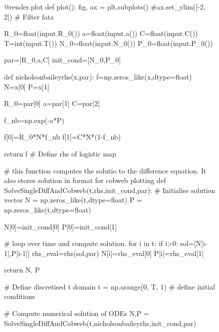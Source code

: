 \documentclass[
  letterpaper,
  DIV=11,
  numbers=noendperiod]{scrreprt}
\newenvironment{Shaded}{\begin{snugshade}}{\end{snugshade}}
\newcommand{\NormalTok}[1]{\textcolor[rgb]{0.00,0.23,0.31}{#1}}
\begin{document}
\begin{figure}
{\begin{Shaded}
\begin{Highlighting}[]
\NormalTok{    @render.plot}
\NormalTok{    def plot():}
\NormalTok{        fig, ax = plt.subplots()}
\NormalTok{        \#ax.set\_ylim([{-}2, 2])}
\NormalTok{        \# Filter fata}
        
        
\NormalTok{        R\_0=float(input.R\_0())}
\NormalTok{        a=float(input.a())}
\NormalTok{        C=float(input.C())}
\NormalTok{        T=int(input.T())}
\NormalTok{        N\_0=float(input.N\_0())}
\NormalTok{        P\_0=float(input.P\_0())}

\NormalTok{        par=[R\_0,a,C]}
\NormalTok{        init\_cond=[N\_0,P\_0]}

\NormalTok{        def nicholsonbaileyrhs(x,par):}
\NormalTok{          f=np.zeros\_like(x,dtype=float)}
\NormalTok{          N=x[0]}
\NormalTok{          P=x[1]}

\NormalTok{          R\_0=par[0]}
\NormalTok{          a=par[1]}
\NormalTok{          C=par[2]}

\NormalTok{          f\_nb=np.exp({-}a*P)}

\NormalTok{          f[0]=R\_0*N*f\_nb}
\NormalTok{          f[1]=C*N*(1{-}f\_nb)}

\NormalTok{          return f}
\NormalTok{        \# Define rhs of logistic map }
     
\NormalTok{        \# this function computes the solutio to the difference equation. It also stores solution in format for cobweb plotting}
\NormalTok{        def SolveSingleDiffAndCobweb(t,rhs,init\_cond,par):}
\NormalTok{          \# Initialise solution vector}
\NormalTok{          N = np.zeros\_like(t,dtype=float)}
\NormalTok{          P = np.zeros\_like(t,dtype=float)}

\NormalTok{          N[0]=init\_cond[0]}
\NormalTok{          P[0]=init\_cond[1]}

\NormalTok{          \# loop over time and compute solution.}
\NormalTok{          for i in t:}
\NormalTok{            if i\textgreater{}0:}
\NormalTok{              sol=[N[i{-}1],P[i{-}1]]}
\NormalTok{              rhs\_eval=rhs(sol,par)}
\NormalTok{              N[i]=rhs\_eval[0]}
\NormalTok{              P[i]=rhs\_eval[1]}

 
\NormalTok{          return N, P}

\NormalTok{        \# Define discretised t domain}
\NormalTok{        t = np.arange(0, T, 1)}
\NormalTok{        \# define initial conditions}
        
\NormalTok{        \# Compute numerical solution of ODEs}
\NormalTok{        N,P = SolveSingleDiffAndCobweb(t,nicholsonbaileyrhs,init\_cond,par)}


\end{Highlighting}
\end{Shaded}}
\end{figure}
\end{document}
